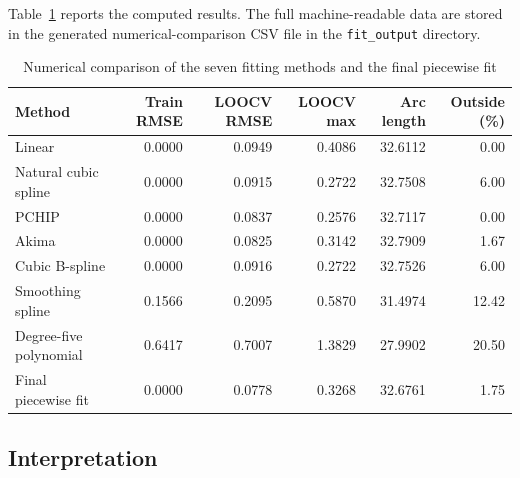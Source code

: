 \documentclass[a4paper,11pt]{article}
\begin{document}
Table~\ref{tab:comparison} reports the computed results.  The full machine-readable
data are stored in the generated numerical-comparison CSV file in the
\texttt{fit\_output} directory.

\begin{table}[H]
\centering
\scriptsize
\caption{Numerical comparison of the seven fitting methods and the final
piecewise fit}
\label{tab:comparison}
\begin{tabular}{lrrrrr}
\toprule
\textbf{Method} &
\textbf{Train RMSE} &
\textbf{LOOCV RMSE} &
\textbf{LOOCV max} &
\textbf{Arc length} &
\textbf{Outside (\%)}\\
\midrule
Linear & 0.0000 & 0.0949 & 0.4086 & 32.6112 & 0.00\\
Natural cubic spline & 0.0000 & 0.0915 & 0.2722 & 32.7508 & 6.00\\
PCHIP & 0.0000 & 0.0837 & 0.2576 & 32.7117 & 0.00\\
Akima & 0.0000 & 0.0825 & 0.3142 & 32.7909 & 1.67\\
Cubic B-spline & 0.0000 & 0.0916 & 0.2722 & 32.7526 & 6.00\\
Smoothing spline & 0.1566 & 0.2095 & 0.5870 & 31.4974 & 12.42\\
Degree-five polynomial & 0.6417 & 0.7007 & 1.3829 & 27.9902 & 20.50\\
Final piecewise fit & 0.0000 & 0.0778 & 0.3268 & 32.6761 & 1.75\\
\bottomrule
\end{tabular}
\end{table}

\subsection{Interpretation}
\end{document}
